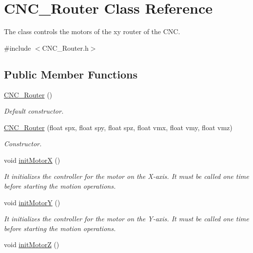 \hypertarget{class_c_n_c___router}{\section{C\+N\+C\+\_\+\+Router Class Reference}
\label{class_c_n_c___router}
}


The class controls the motors of the xy router of the C\+N\+C.  




{\ttfamily \#include $<$C\+N\+C\+\_\+\+Router.\+h$>$}

\subsection*{Public Member Functions}
\begin{DoxyCompactItemize}
\item 
\hyperlink{class_c_n_c___router_a2286f545f42ff5febfdb8d52782cd0da}{C\+N\+C\+\_\+\+Router} ()
\begin{DoxyCompactList}\small\item\em Default constructor. \end{DoxyCompactList}\item 
\hyperlink{class_c_n_c___router_af7a84e8ac77176373ac24bb1aadc1b97}{C\+N\+C\+\_\+\+Router} (float spx, float spy, float spz, float vmx, float vmy, float vmz)
\begin{DoxyCompactList}\small\item\em Constructor. \end{DoxyCompactList}\item 
void \hyperlink{class_c_n_c___router_a89f4cbde58844154f247d2bf02a167fb}{init\+Motor\+X} ()
\begin{DoxyCompactList}\small\item\em It initializes the controller for the motor on the X-\/axis. It must be called one time before starting the motion operations. \end{DoxyCompactList}\item 
void \hyperlink{class_c_n_c___router_a7f13e636e4b92c5547995b653cea317e}{init\+Motor\+Y} ()
\begin{DoxyCompactList}\small\item\em It initializes the controller for the motor on the Y-\/axis. It must be called one time before starting the motion operations. \end{DoxyCompactList}\item 
void \hyperlink{class_c_n_c___router_a2ae50762cc38690090515f30bcd5033c}{init\+Motor\+Z} ()

\end{DoxyCompactItemize}
